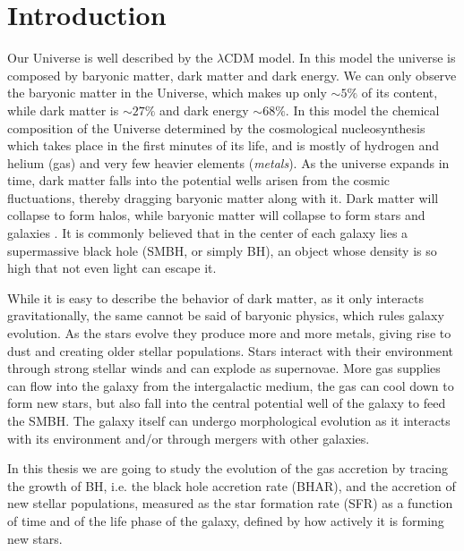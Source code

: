 \chapter{Introduction}


Our Universe is well described by the $\lambda$CDM %
model. In this model the universe is composed by baryonic matter, dark matter and dark energy. We can only observe the baryonic matter in the Universe, which makes up only $\sim 5\%$ of its content, while dark matter is $\sim 27\%$ and dark energy $\sim 68\%$. In this model the chemical composition of the Universe determined by the cosmological nucleosynthesis which takes place in the first minutes of its life, and is mostly of hydrogen and helium (gas) and very few heavier elements (\emph{metals}). As the universe expands in time, dark matter falls into the potential wells arisen from the cosmic fluctuations, thereby dragging baryonic matter along with it. Dark matter will collapse to form halos, while baryonic matter will collapse to form stars and galaxies \citep{2009ApJS..180..330K,2007ApJS..170..377S,2020A&A...641A...1P}. It is commonly believed that in the center of each galaxy lies a supermassive black hole (SMBH, or simply BH), an object whose density is so high that not even light can escape it. 

While it is easy to describe the behavior of dark matter, as it only interacts gravitationally, the same cannot be said of baryonic physics, which rules galaxy evolution. As the stars evolve they produce more and more metals, giving rise to dust and creating older stellar populations. Stars interact with their environment through strong stellar winds and can explode as supernovae. More gas supplies can flow into the galaxy from the intergalactic medium, the gas can cool down to form new stars, but also fall into the central potential well of the galaxy to feed the SMBH. The galaxy itself can undergo morphological evolution as it interacts with its environment and/or through mergers with other galaxies. 

In this thesis we are going to study the evolution of the gas accretion by tracing the growth of BH, i.e. the black hole accretion rate (BHAR), and the accretion of new stellar populations, measured as the star formation rate (SFR) as a function of time and of the life phase of the galaxy, defined by how actively it is forming new stars.

